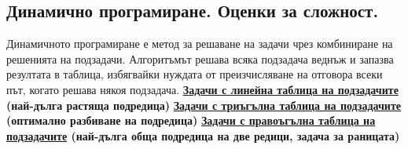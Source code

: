 \documentclass{article}
\begin{document}
\subsection*{Динамично програмиране. Оценки за сложност.}

Динамичното програмиране е метод за решаване на задачи чрез комбиниране на решенията на подзадачи. Алгоритъмът решава всяка
подзадача веднъж и запазва резултата в таблица, избягвайки нуждата от преизчисляване на отговора всеки път, когато решава някоя
подзадача. \newline\newline
\textbf{\underline{Задачи с линейна таблица на подзадачите} (най-дълга растяща подредица)} \newline\newline
\textbf{\underline{Задачи с триъгълна таблица на подзадачите} (оптимално разбиване на подредица)} \newline\newline
\textbf{\underline{Задачи с правоъгълна таблица на подзадачите} (най-дълга обща подредица на две редици, задача за раницата)} \newline\newline
\end{document}
